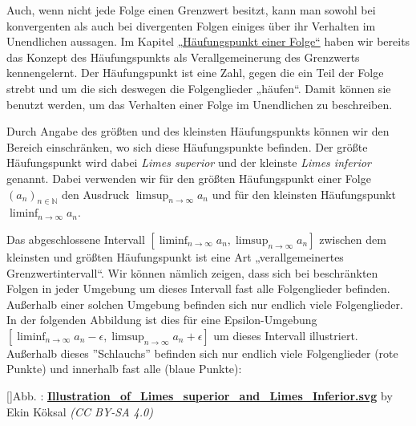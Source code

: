 \documentclass[fontsize=9pt,
               parskip=half-,
               DIV=14,
               listof=chapterentry,
               tocflat]{scrbook}
\newcounter{imagelabel}
\begin{document}
Auch, wenn nicht jede Folge einen Grenzwert besitzt, kann man sowohl bei konvergenten als auch bei divergenten Folgen einiges über ihr Verhalten im Unendlichen aussagen. Im Kapitel \href{https://de.wikibooks.org/wiki/Mathe\_für\_Nicht-Freaks:\_Häufungspunkt\_einer\_Folge}
{„Häufungspunkt einer Folge“} haben wir bereits das Konzept des Häufungspunkts als Verallgemeinerung des Grenzwerts kennengelernt. Der Häufungspunkt ist eine Zahl, gegen die ein Teil der Folge strebt und um die sich deswegen die Folgenglieder „häufen“. Damit können sie benutzt werden, um das Verhalten einer Folge im Unendlichen zu beschreiben.

Durch Angabe des größten und des kleinsten Häufungspunkts können wir den Bereich einschränken, wo sich diese Häufungspunkte befinden. Der größte Häufungspunkt wird dabei \emph{Limes superior} und der kleinste \emph{Limes inferior} genannt. Dabei verwenden wir für den größten Häufungspunkt einer Folge $(a_{n})_{n\in \mathbb {N} }$ den Ausdruck $\limsup _{n\to \infty }a_{n}$ und für den kleinsten Häufungspunkt $\liminf _{n\to \infty }a_{n}$.

Das abgeschlossene Intervall $\left[\liminf _{n\to \infty }a_{n},\limsup _{n\to \infty }a_{n}\right]$ zwischen dem kleinsten und größten Häufungspunkt ist eine Art „verallgemeinertes Grenzwertintervall“. Wir können nämlich zeigen, dass sich bei beschränkten Folgen in jeder Umgebung um dieses Intervall fast alle Folgenglieder befinden. Außerhalb einer solchen Umgebung befinden sich nur endlich viele Folgenglieder. In der folgenden Abbildung ist dies für eine Epsilon-Umgebung $\left[\liminf _{n\to \infty }a_{n}-\epsilon ,\limsup _{n\to \infty }a_{n}+\epsilon \right]$ um dieses Intervall illustriert. Außerhalb dieses {''}Schlauchs{''} befinden sich nur endlich viele Folgenglieder (rote Punkte) und innerhalb fast alle (blaue Punkte):

[]{Abb. : \protect\href{https://commons.wikimedia.org/wiki/File:Illustration_of_Limes_superior_and_Limes_Inferior.svg}{\textbf{Illustration\allowbreak\_of\allowbreak\_Limes\allowbreak\_superior\allowbreak\_and\allowbreak\_Limes\allowbreak\_Inferior.svg}} by Ekin Köksal \textit{(CC BY-SA 4.0)}}\begin{center}
\end{center}
\end{document}
